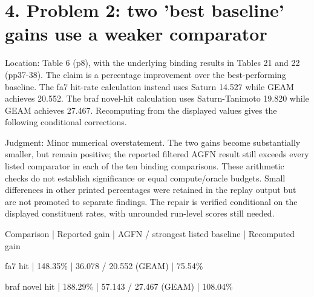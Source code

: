 \documentclass[10pt]{article}
\begin{document}
\section*{4. Problem 2: two ’best baseline’ gains use a weaker comparator}
Location: Table 6 (p8), with the underlying binding results in Tables 21 and 22 (pp37-38). The claim is a percentage improvement over the best-performing baseline. The fa7 hit-rate calculation instead uses Saturn 14.527 while GEAM achieves 20.552. The braf novel-hit calculation uses Saturn-Tanimoto 19.820 while GEAM achieves 27.467. Recomputing from the displayed values gives the following conditional corrections.\par
Judgment: Minor numerical overstatement. The two gains become substantially smaller, but remain positive; the reported filtered AGFN result still exceeds every listed comparator in each of the ten binding comparisons. These arithmetic checks do not establish significance or equal compute/oracle budgets. Small differences in other printed percentages were retained in the replay output but are not promoted to separate findings. The repair is verified conditional on the displayed constituent rates, with unrounded run-level scores still needed.\par
Comparison | Reported gain | AGFN / strongest listed baseline | Recomputed gain\par
fa7 hit | 148.35\% | 36.078 / 20.552 (GEAM) | 75.54\%\par
braf novel hit | 188.29\% | 57.143 / 27.467 (GEAM) | 108.04\%\par
\end{document}
